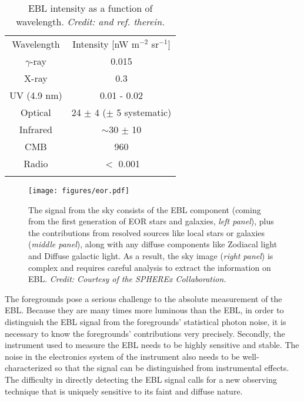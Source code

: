 \begin{table}[!ht]
	\begin{center}
	\caption[EBL intensity as a function of wavelength.]{EBL intensity as a function of wavelength. \textit{Credit: \citet{Cooray2016} and ref. therein.}}\label{table:EBL_values}
		\begin{tabular}{c|c}
			\tableline\tableline
			Wavelength		&		Intensity [nW m$^{-2}$ sr$^{-1}$]\\
			\tableline		
			$\gamma$-ray		&	0.015\\
			X-ray				& 	0.3\\
			UV (4.9 nm)			& 	0.01 - 0.02\\
			Optical				&	24 $\pm$ 4 ($\pm$ 5 systematic)\\
			Infrared				&	$\sim$30 $\pm$ 10\\
			CMB					&	960\\
			Radio				&	$<$ 0.001\\
			\tableline
		\end{tabular}
	\end{center}
	\vspace{-20pt}
\end{table}


\begin{figure}[h]
	\centering
	\texttt{[image: figures/eor.pdf]} 
	\caption[Observed EBL signal with foregrounds.]{The signal from the sky consists of the EBL component (coming from the first generation of EOR stars and galaxies, \textit{left panel}), plus the contributions from resolved sources like local stars or galaxies (\textit{middle panel}), along with any diffuse components like Zodiacal light and Diffuse galactic light. As a result, the sky image (\textit{right panel}) is complex and requires careful analysis to extract the information on EBL. \textit{Credit: Courtesy of the SPHEREx Collaboration.}\label{fig:foregrounds}}
\end{figure}


The foregrounds pose a serious challenge to the absolute measurement of the EBL.
Because they are many times more luminous than the EBL, in order to distinguish the EBL signal from the foregrounds' statistical photon noise, it is necessary to know the foregrounds' contributions very precisely. Secondly, the instrument used to measure the EBL needs to be highly sensitive and stable. 
The noise in the electronics system of the instrument also needs to be well-characterized so that the signal can be distinguished from instrumental effects. The difficulty in directly detecting the EBL signal calls for a new observing technique that is uniquely sensitive to its faint and diffuse nature.



